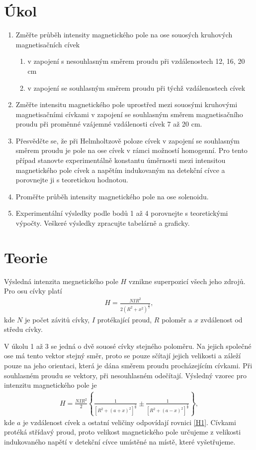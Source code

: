 \documentclass[a4paper,12pt]{article}
\begin{document}
\section{Úkol}
\noindent
\begin{enumerate}
\item Změřte průběh intensity magnetického pole na ose souosých kruhových magnetisačních cívek
         \begin{enumerate}  \item v zapojení s nesouhlasným směrem proudu při vzdálenostech 12, 16, 20 cm
                            \item v zapojení se souhlasným směrem proudu při týchž vzdálenostech cívek 
        \end{enumerate}
\item Změřte intensitu magnetického pole uprostřed mezi souosými kruhovými magnetisačními cívkami v 
zapojení se souhlasným směrem magnetisačního proudu při proměnné vzájemné vzdálenosti cívek 7 až 20 cm.
\item Přesvědčte se, že při Helmholtzově poloze cívek v zapojení se souhlasným směrem proudu je pole na
ose cívek v rámci možností homogenní. Pro tento případ stanovte experimentálně konstantu úměrnosti mezi 
intensitou magnetického pole cívek a napětím indukovaným na detekční cívce a porovnejte ji s teoretickou hodnotou.
\item Proměřte průběh intensity magnetického pole na ose solenoidu.
\item Experimentální výsledky podle bodů 1 až 4 porovnejte s teoretickými výpočty. Veškeré výsledky zpracujte tabelárně a graficky. 
\end{enumerate}

\section{Teorie}
Výsledná intenzita megnetického pole $H$ vznikne superpozicí všech jeho zdrojů. Pro osu cívky platí
\begin{eqnarray}
H=\frac{NIR^2}{2(R^2+x^2)^\frac{3}{3}},
\label{H1}
\end{eqnarray}
kde $N$ je počet závitů cívky, $I$ protékající proud, $R$ poloměr a $x$ zvdálenost od středu cívky.

V úkolu 1 až 3 se jedná o dvě souosé cívky stejného poloměru. Na jejich společné ose má tento vektor 
stejný směr, proto se pouze sčítají jejich velikosti 
a záleží pouze na jeho orientaci, která je dána směrem proudu procházejícím cívkami. Při souhlasném proudu se vektory, 
při nesouhlasném odečítají. Výsledný vzorec pro intenzitu magnetického pole je
\begin{eqnarray}
H=\frac{NIR^2}{2} \left\{ \frac{1}{[R^2+(a+x)^2]^\frac{3}{2}}\pm  \frac{1}{[R^2+(a-x)^2]^\frac{3}{2}} \right\},
\label{H2}
\end{eqnarray}
kde $a$ je vzdálenost cívek a ostatní veličiny odpovídají rovnici \ref{H1}.
Cívkami protéká střídavý proud, proto velikost magnetického pole určujeme z velikosti 
indukovaného napětí v detekční cívce umístěné na místě, které vyšetřujeme. 
\end{document}

